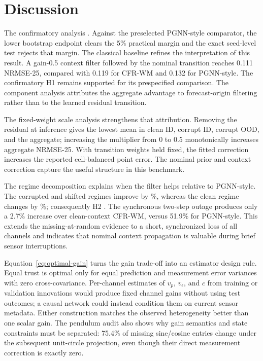 \section{Discussion}

The confirmatory analysis \PrimaryInterpretation. Against the preselected
PGNN-style comparator, the lower bootstrap endpoint clears the 5\% practical
margin and the exact seed-level test rejects that margin. The classical
baseline refines the interpretation of this result. A gain-0.5
context filter followed by the nominal transition reaches 0.111 NRMSE-25,
compared with 0.119 for CFR-WM and 0.132 for PGNN-style. The confirmatory H1
remains supported for its prespecified comparison. The component analysis
attributes the aggregate advantage to forecast-origin filtering rather than to
the learned residual transition.

The fixed-weight scale analysis strengthens that attribution. Removing the
residual at inference gives the lowest mean in clean ID, corrupt ID, corrupt
OOD, and the aggregate; increasing the multiplier from 0 to 0.5 monotonically
increases aggregate NRMSE-25. With transition weights held fixed, the fitted
correction increases the reported cell-balanced point error. The nominal prior
and context correction capture the useful structure in this benchmark.

The regime decomposition explains when the filter helps relative to PGNN-style.
The corrupted and shifted regimes improve by \CorruptImprovement\%, whereas
the clean regime changes by \CleanImprovement\%; consequently H2
\RobustnessInterpretation. The synchronous two-step outage produces only a
2.7\% increase over clean-context CFR-WM, versus 51.9\% for PGNN-style. This
extends the missing-at-random evidence to a short, synchronized loss of all
channels and indicates that nominal context propagation is valuable during
brief sensor interruptions.

Equation~\eqref{eq:optimal-gain} turns the gain trade-off into an estimator
design rule. Equal trust is optimal only for equal prediction and measurement
error variances with zero cross-covariance. Per-channel estimates of
$v_p$, $v_\epsilon$, and $c$ from training or validation innovations would
produce fixed channel gains without using test outcomes; a causal network could
instead condition them on current sensor metadata. Either construction matches
the observed heterogeneity better than one scalar gain. The pendulum audit also
shows why gain semantics and state constraints must be separated: 75.4\% of
missing sine/cosine entries change under the subsequent unit-circle projection,
even though their direct measurement correction is exactly zero.

